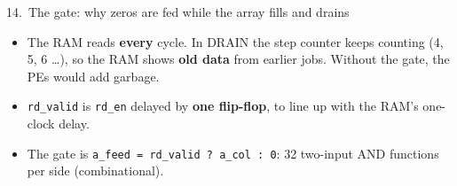 \documentclass[aspectratio=169,11pt]{beamer}
\newcommand{\sig}[1]{\texttt{#1}}
\newcommand{\cw}{0.88}
\newcommand{\bus}[4]{%
  \draw[pcbmid] ({(#1)*\cw+0.06},#3) -- ({(#1)*\cw+0.12},#3+0.2) -- ({(#2)*\cw-0.06},#3+0.2) -- ({(#2)*\cw},#3)
                -- ({(#2)*\cw-0.06},#3-0.2) -- ({(#1)*\cw+0.12},#3-0.2) -- cycle;
  \node[font=\tiny\ttfamily] at ({((#1)+(#2))*\cw/2+0.03},#3) {#4};}
\newcommand{\pulse}[4]{%
  \draw[copper, thick] (0,#1-0.18) -- ({(#2)*\cw},#1-0.18) -- ({(#2)*\cw},#1+0.18) -- ({(#3)*\cw},#1+0.18)
                       -- ({(#3)*\cw},#1-0.18) -- ({(#4)*\cw},#1-0.18);}
\newcommand{\clockrow}[2]{%
  \foreach \c in {1,...,#2} {
    \draw[pcbmid] ({(\c-1)*\cw},#1-0.18) -- ({(\c-1)*\cw},#1+0.18) -- ({(\c-0.5)*\cw},#1+0.18)
                  -- ({(\c-0.5)*\cw},#1-0.18) -- ({\c*\cw},#1-0.18);}}
\begin{document}
\begin{frame}{14.\ The gate: why zeros are fed while the array fills and drains}
  \centering
  {\renewcommand{\cw}{1.32}
  }

  \vspace{2mm}\raggedright\small
  \begin{itemize}
    \item The RAM reads \textbf{every} cycle. In DRAIN the step counter keeps counting (4, 5, 6 \ldots), so the RAM
          shows \textbf{old data} from earlier jobs. Without the gate, the PEs would add garbage.
    \item \sig{rd\_valid} is \sig{rd\_en} delayed by \textbf{one flip-flop}, to line up with the RAM's one-clock delay.
    \item The gate is \sig{a\_feed = rd\_valid ? a\_col : 0}: 32 two-input AND functions per side (combinational).
  \end{itemize}
\end{frame}
\end{document}
